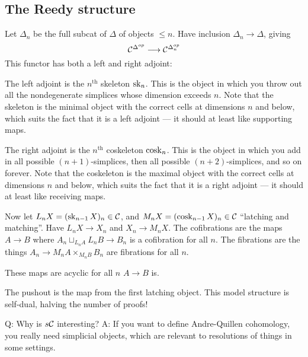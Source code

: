 \documentclass[11pt]{article}
\begin{document}
\begin{InnaSimplicalModelCats}
\subsection*{The Reedy structure}
\begin{defn*} Let $\Delta_n$ be the full subcat of $\Delta$ of objects $\leq n$. Have inclusion $\Delta_n\to\Delta$, giving
\[\mathcal{C}^{\Delta^{op}}\longrightarrow\mathcal{C}^{\Delta^{op}_n}\]
This functor has both a left and right adjoint:
\begin{itemise}
\item The left adjoint is the $n^\text{th}$ skeleton $\operatorname{sk}_n$. This is the object in which you throw out all the nondegenerate simplices whose dimension exceeds $n$. Note that the skeleton is the minimal object with the correct cells at dimensions $n$ and below, which suits the fact that it is a left adjoint --- it should at least like supporting maps.
\item The right adjoint is the $n^\text{th}$ coskeleton $\operatorname{cosk}_n$. This is the object in which you add in all possible $(n+1)$-simplices, then all possible $(n+2)$-simplices, and so on forever. Note that the coskeleton is the maximal object with the correct cells at dimensions $n$ and below, which suits the fact that it is a right adjoint --- it should at least like receiving maps.
\end{itemise}
Now let $L_nX=(\operatorname{sk}_{n-1}X)_n\in\mathcal{C}$, and $M_nX=(\operatorname{cosk}_{n-1}X)_n\in\mathcal{C}$ ``latching and matching''. Have $L_nX\to X_n$ and $X_n\to M_nX$. The cofibrations are the maps $A\to B$ where $A_n\sqcup_{L_nA}L_nB\to B_n$ is a cofibration for all $n$.
The fibrations are the things $A_n\to M_nA\times_{M_nB}B_n$ are fibrations for all $n$.
\end{defn*}
\begin{cor*}
These maps are acyclic for all $n$ \Iff $A\to B$ is.
\end{cor*}
The pushout is the map from the first latching object. This model structure is self-dual, halving the number of proofs!

Q: Why is $s\mathcal{C}$ interesting?
A: If you want to define Andre-Quillen cohomology, you really need simplicial objects, which are relevant to resolutions of things in some settings.

\pagebreak
\end{InnaSimplicalModelCats}
\end{document}
